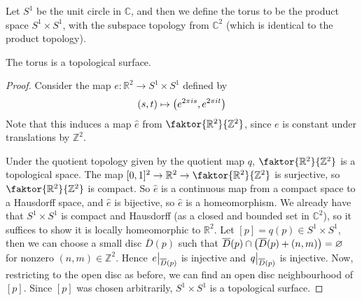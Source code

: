 \begin{example}
	Let \( S^1 \) be the unit circle in \( \mathbb C \), and then we define the torus to be the product space \( S^1 \times S^1 \), with the subspace topology from \( \mathbb C^2 \) (which is identical to the product topology).
	\begin{lemma}
		The torus is a topological surface.
	\end{lemma}
	\begin{proof}
		Consider the map \( e \colon \mathbb R^2 \to S^1 \times S^1 \) defined by
		\[
			(s,t) \mapsto \qty(e^{2\pi i s}, e^{2 \pi i t})
		\]
		Note that this induces a map \( \hat e \) from \( \faktor{\mathbb R^2}{\mathbb Z^2} \), since \( e \) is constant under translations by \( \mathbb Z^2 \).

		\begin{center}
			\ifdefined\hideproofs
			\else
			\fi
		\end{center}

		Under the quotient topology given by the quotient map \( q \), \( \faktor{\mathbb R^2}{\mathbb Z^2} \) is a topological space.
		The map \( [0,1]^2 \to \mathbb R^2 \to \faktor{\mathbb R^2}{\mathbb Z^2} \) is surjective, so \( \faktor{\mathbb R^2}{\mathbb Z^2} \) is compact.
		So \( \hat e \) is a continuous map from a compact space to a Hausdorff space, and \( \hat e \) is bijective, so \( \hat e \) is a homeomorphism.
		We already have that \( S^1 \times S^1 \) is compact and Hausdorff (as a closed and bounded set in \( \mathbb C^2 \)), so it suffices to show it is locally homeomorphic to \( \mathbb R^2 \).
		Let \( [p] = q(p) \in S^1 \times S^1 \), then we can choose a small disc \( \overline D(p) \) such that \( \overline D(p) \cap \qty(\overline D(p) + (n,m)) = \varnothing \) for nonzero \( (n,m) \in \mathbb Z^2 \).
		Hence \( \eval{e}_{\overline D(p)} \) is injective and \( \eval{q}_{\overline D(p)} \) is injective.
		Now, restricting to the open disc as before, we can find an open disc neighbourhood of \( [p] \).
		Since \( [p] \) was chosen arbitrarily, \( S^1 \times S^1 \) is a topological surface.
	\end{proof}
\end{example}


